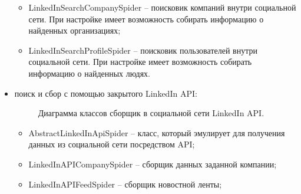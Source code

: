 \begin{itemize}
\begin{itemize}
        \item LinkedInSearchCompanySpider -- поисковик компаний внутри социальной сети. При настройке имеет возможность 
        собирать информацию о найденных организациях;
        \item LinkedInSearchProfileSpider -- поисковик пользователей внутри социальной сети. При настройке имеет возможность
        собирать информацию о найденных людях.
    \end{itemize}
    \item поиск и сбор с помощью закрытого LinkedIn API:
    \begin{figure}[H]
        \caption{Диаграмма классов сборщик в социальной сети LinkedIn API.}
        \label{ris:image}
    \end{figure}
    \begin{itemize}
        \item AbstractLinkedInApiSpider -- класс, который эмулирует для получения данных из социальной сети посредством
        API;
        \item LinkedInAPICompanySpider -- сборщик данных заданной компании;
        \item LinkedInAPIFeedSpider -- сборщик новостной ленты;

\end{itemize}
\end{itemize}
